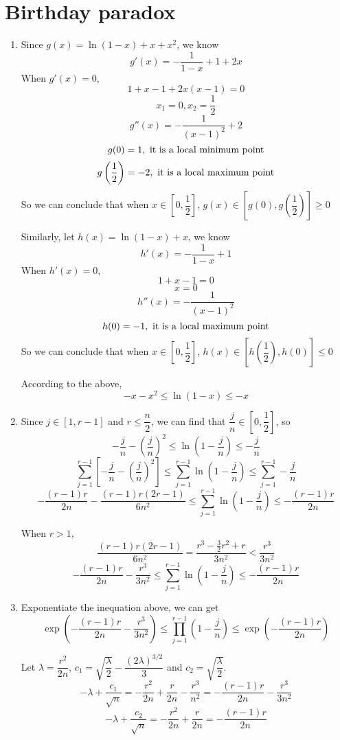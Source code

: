\documentclass{article}
\begin{document}
\section{Birthday paradox}
\begin{enumerate}
\item
Since $g(x)=\ln(1-x)+x+x^2$, we know
$$g'(x)=-\frac{1}{1-x}+1+2x$$
When $g'(x)=0$,
$$1+x-1+2x(x-1)=0$$
$$x_1=0,x_2=\frac{1}{2}$$
$$g''(x)=-\frac{1}{(x-1)^2}+2$$
$$g(0)=1,{\rm\ it\ is\ a\ local\ minimum\ point}$$
$$g\left(\frac{1}{2}\right)=-2,{\rm\ it\ is\ a\ local\ maximum\ point}$$
So we can conclude that when $x\in\left[0,\dfrac{1}{2}\right]$, $g(x)\in\left[g(0),g\left(\dfrac{1}{2}\right)\right]\geqslant 0$

Similarly, let $h(x)=\ln(1-x)+x$, we know
$$h'(x)=-\frac{1}{1-x}+1$$
When $h'(x)=0$,
$$1+x-1=0$$
$$x=0$$
$$h''(x)=-\frac{1}{(x-1)^2}$$
$$h(0)=-1,{\rm\ it\ is\ a\ local\ maximum\ point}$$
So we can conclude that when $x\in\left[0,\dfrac{1}{2}\right]$, $h(x)\in\left[h\left(\dfrac{1}{2}\right),h(0)\right]\leqslant 0$

According to the above, $$-x-x^2 \leqslant \ln(1-x) \leqslant -x$$

\item
Since $j\in[1,r-1]$ and $r\leqslant \dfrac{n}{2}$, we can find that $\dfrac{j}{n}\in\left[0,\dfrac{1}{2}\right]$, so
$$-\frac{j}{n}-\left(\frac{j}{n}\right)^2 \leqslant \ln\left(1-\frac{j}{n}\right) \leqslant -\frac{j}{n}$$
$$\sum_{j=1}^{r-1} \left[ -\frac{j}{n}-\left(\frac{j}{n}\right)^2 \right] \leqslant \sum_{j=1}^{r-1} \ln\left(1-\frac{j}{n}\right) \leqslant \sum_{j=1}^{r-1} -\frac{j}{n}$$
$$-\frac{(r-1)r}{2n}-\frac{(r-1)r(2r-1)}{6n^2} \leqslant \sum_{j=1}^{r-1} \ln\left(1-\frac{j}{n}\right) \leqslant -\frac{(r-1)r}{2n}$$

When $r>1$, $$\frac{(r-1)r(2r-1)}{6n^2}=\frac{r^3-\frac{3}{2}r^2+r}{3n^2}<\frac{r^3}{3n^2}$$
$$-\frac{(r-1)r}{2n}-\frac{r^3}{3n^2} \leqslant \sum_{j=1}^{r-1} \ln\left(1-\frac{j}{n}\right) \leqslant -\frac{(r-1)r}{2n}$$

\item
Exponentiate the inequation above, we can get
$$\exp\left(-\frac{(r-1)r}{2n}-\frac{r^3}{3n^2}\right) \leqslant \prod_{j=1}^{r-1} \left(1-\frac{j}{n}\right) \leqslant \exp\left(-\frac{(r-1)r}{2n}\right)$$

Let $\lambda=\dfrac{r^2}{2n}$, $c_1=\sqrt{\dfrac{\lambda}{2}}-\dfrac{(2\lambda)^{3/2}}{3}$ and $c_2=\sqrt{\dfrac{\lambda}{2}}$.
$$-\lambda+\frac{c_1}{\sqrt{n}}=-\frac{r^2}{2n}+\frac{r}{2n}-\frac{r^3}{n^2}=-\frac{(r-1)r}{2n}-\frac{r^3}{3n^2}$$
$$-\lambda+\frac{c_2}{\sqrt{n}}=-\frac{r^2}{2n}+\frac{r}{2n}=-\frac{(r-1)r}{2n}$$


\end{enumerate}
\end{document}
